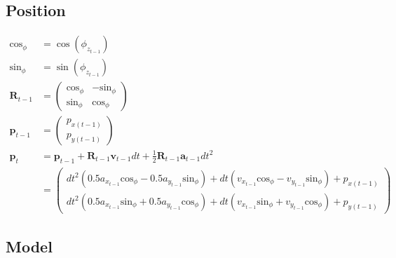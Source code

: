 \documentclass{article}
\begin{document}
\subsection{Position}
\begin{align}
  \textrm{cos}_\phi &= \cos{\left(\phi_{z_{t-1}} \right)} \\
  \textrm{sin}_\phi &= \sin{\left(\phi_{z_{t-1}} \right)} \\
  \textbf{R}_{t-1} &= \left(\begin{matrix}\textrm{cos}_\phi & - \textrm{sin}_\phi\\\textrm{sin}_\phi & \textrm{cos}_\phi\end{matrix}\right) \\
  \textbf{p}_{t-1} &= \left(\begin{matrix}p_{x (t-1)}\\p_{y (t-1)}\end{matrix}\right) \\
  \textbf{p}_t &= \textbf{p}_{t-1} + \textbf{R}_{t-1}\textbf{v}_{t-1}dt + \frac{1}{2}\textbf{R}_{t-1}\textbf{a}_{t-1}dt^2 \\
  &= \left(\begin{matrix}dt^{2} \left(0.5 a_{x_{t-1}} \textrm{cos}_\phi - 0.5 a_{y_{t-1}} \textrm{sin}_\phi\right) + dt \left(v_{x_{t-1}} \textrm{cos}_\phi - v_{y_{t-1}} \textrm{sin}_\phi\right) + p_{x (t-1)}\\dt^{2} \left(0.5 a_{x_{t-1}} \textrm{sin}_\phi + 0.5 a_{y_{t-1}} \textrm{cos}_\phi\right) + dt \left(v_{x_{t-1}} \textrm{sin}_\phi + v_{y_{t-1}} \textrm{cos}_\phi\right) + p_{y (t-1)}\end{matrix}\right)
\end{align}

\subsection{Model}
\end{document}
